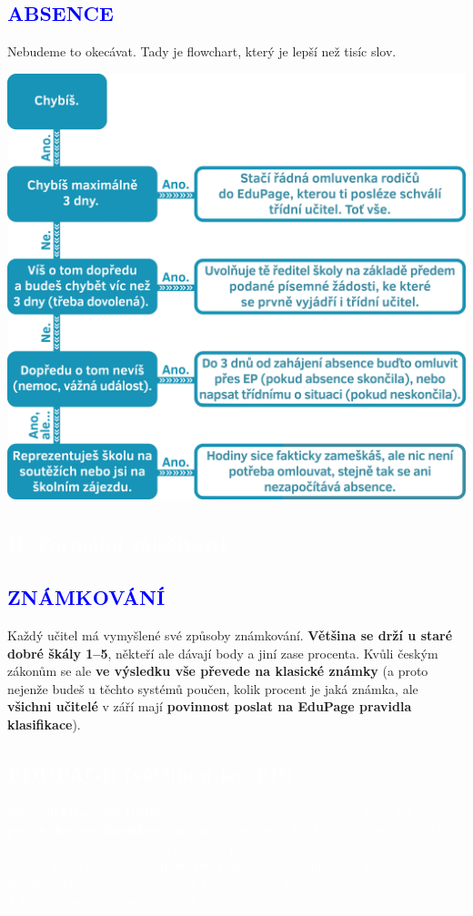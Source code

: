 \documentclass[a5paper, twoside]{article}
\newcommand{\polonadpis}[4]{
  \vspace*{-50pt}
  \begin{tcolorbox}[colback = #2, boxrule = 0pt, grow to left by = #4,  grow to right by = #4, arc=8pt, height = 30pt]
    \vspace*{5pt}
    \centering \subsection*{\textcolor{#3}{#1}}
  \end{tcolorbox}
}
\newcommand{\podnadpis}[2]{
  \subsection*{\textcolor{#2}{#1}}
}
\begin{document}
\podnadpis{ABSENCE}{blue}
Nebudeme to okecávat. Tady je flowchart, který je lepší než tisíc slov.
\vfill
\begin{center}
	\includegraphics[width=\linewidth]{absence.png}
\end{center}

\vspace{3em}
\pagebreak

\polonadpis{II. Formální záležitosti}{blue}{white}{-3.8cm}

\podnadpis{ZNÁMKOVÁNÍ}{blue}
Každý učitel má vymyšlené své způsoby známkování. \textbf{Většina se drží u staré dobré škály 1--5}, někteří ale dávají body a jiní zase procenta. Kvůli českým zákonům se ale \textbf{ve výsledku vše převede na klasické známky} (a proto nejenže budeš u těchto  systémů poučen, kolik procent je jaká známka, ale \textbf{všichni učitelé} v září mají \textbf{povinnost poslat na EduPage pravidla klasifikace}).

\begin{bluebox}
  \vspace*{-8pt}
	\textcolor{white}{\subsection*{EDUPAGE (většinou jen EP)}
		\textbf{Naše elektronická třídnice.} Zavedli jsme ji na začátku roku 2020, takže \textbf{prošla doslova zkouškou ohněm} -- a úspěšně (i když to je diskutabilní). Občas na EP nadáváme, ale to snad ani
		nejde jinak. \\
		Faktem je, že tam najdeš \textbf{úplně všechno} -- rozvrhy, suplování, úkoly, hlasování, známky, absence, prezentace, ... A to všechno na kvadrát. \\
		A taky si tam můžeš psát s učiteli.
	}
\end{bluebox}
\end{document}
